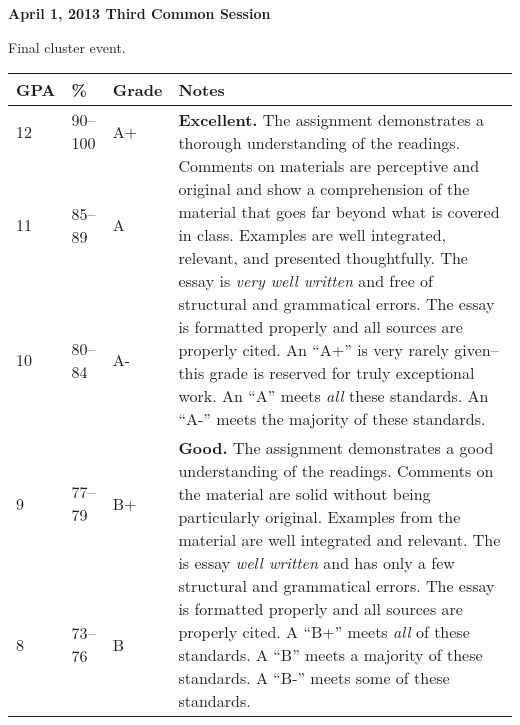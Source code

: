 \documentclass[12pt]{article}
\begin{document}
\textbf{April 1, 2013 \hspace{.125in} Third Common Session}

Final cluster event.

\newpage

{\footnotesize
\begin{tabular}{|l|l|l|l|}
\hline
\textbf{GPA} & \textbf{\%} & \textbf{Grade} & \textbf{Notes} \\
\hline
\multirow{3}{*}{12} & \multirow{3}{*}{90--100} & \multirow{3}{*}{A+} & \multirow{10}{4in}{\textbf{Excellent.} The assignment demonstrates a thorough understanding of the readings. Comments on materials are perceptive and original and show a comprehension of the material that goes far beyond what is covered in class. Examples are well integrated, relevant, and presented thoughtfully. The essay is \textit{very well written} and free of structural and grammatical errors. The essay is formatted properly and all sources are properly cited. An ``A+'' is very rarely given--this grade is reserved for truly exceptional work. An ``A'' meets \textit{all} these standards. An ``A-'' meets the majority of these standards.} \\ 
& & & \\
& & & \\
\multirow{3}{*}{11} & \multirow{3}{*}{85--89} & \multirow{3}{*}{A} & \\
& & & \\
& & & \\
\multirow{3}{*}{10} & \multirow{3}{*}{80--84} & \multirow{3}{*}{A-} & \\ 
& & & \\
& & & \\
& & & \\
\hline
\multirow{3}{*}{9} & \multirow{3}{*}{77--79} & \multirow{3}{*}{B+} & \multirow{9}{4in}{\textbf{Good.} The assignment demonstrates a good understanding of the readings. Comments on the material are solid without being particularly original. Examples from the material are well integrated and relevant. The is essay \textit{well written} and has only a few structural and grammatical errors. The essay is formatted properly and all sources are properly cited. A ``B+'' meets \textit{all} of these standards. A ``B'' meets a majority of these standards. A ``B-'' meets some of these standards.}\\
& & & \\
& & & \\
\multirow{3}{*}{8} & \multirow{3}{*}{73--76} & \multirow{3}{*}{B} & \\

\end{tabular}}
\end{document}
